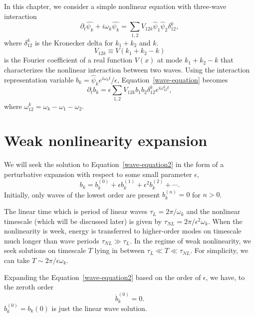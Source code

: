 In this chapter, we consider a simple nonlinear equation with three-wave interaction
\begin{equation}\label{wave-equation}
	\partial_t\hat{\psi_k}+i\omega_k\hat{\psi_k} = \sum_{1,2}V_{12k}\hat{\psi}_1\hat{\psi}_2 \delta_{12}^k,
\end{equation}
where $\delta_{12}^{k}$ is the Kronecker delta for $k_1+k_2$ and $k$.
\begin{equation}
	V_{12k}\equiv V(k_1+k_2-k)
\end{equation}
is the Fourier coefficient of a real function $V(x)$ at mode $k_1+k_2-k$ that characterizes the nonlinear interaction between two waves. 
Using the interaction representation variable $b_k = \hat{\psi}_k e^{i\omega_k t}/\epsilon $, Equation~\ref{wave-equation} becomes
\begin{equation}\label{wave-equation2}
	\partial_t b_k = \epsilon \sum\limits_{1,2} V_{12k} b_1 b_2 \delta_{12}^k e^{i\omega_{12}^k t},
\end{equation}
where $\omega_{12}^k = \omega_k-\omega_1-\omega_2$.

\section{Weak nonlinearity expansion}
We will seek the solution to Equation~\ref{wave-equation2} in the form of a perturbative expansion with respect to some small parameter $\epsilon$,
\begin{equation}
	b_k = b_k^{(0)}+\epsilon b_k^{(1)} +\epsilon^2 b_k^{(2)}+\cdots.
\end{equation}
Initially, only waves of the lowest order are present $b_k^{(n)}=0$ for $n>0$.

The linear time which is period of linear waves $\tau_L = 2\pi/\omega_k$ and the nonlinear timescale (which will be discussed later) is given by $\tau_{NL} = 2\pi/\epsilon^2\omega_k$.
When the nonlinearity is week, energy is transferred to higher-order modes on timescale much longer than wave periods $\tau_{NL}\gg\tau_L$.
In the regime of weak nonlinearity, we seek solutions on timescale $T$ lying in between $\tau_{L}\ll T\ll \tau_{NL}$. 
For simplicity, we can take	$T\sim 2\pi/\epsilon \omega_k$.

Expanding the Equation~\ref{wave-equation2} based on the order of $\epsilon$, we have, to the zeroth order 
\begin{equation}
	\dot{b}_k^{(0)} = 0.
\end{equation}
$b_k^{(0)} = b_k(0)$ is just the linear wave solution.

